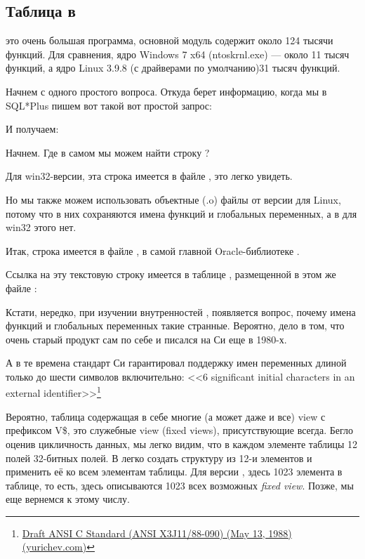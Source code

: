 \subsection{Таблица  в \oracle}

\myindex{\oracle}
 это очень большая программа, основной модуль  содержит около 124 тысячи функций. Для сравнения, ядро Windows 7 x64 (ntoskrnl.exe) --- около 11 тысяч функций, а ядро Linux 3.9.8 (с драйверами по умолчанию)\EMDASH{}31 тысяч функций.

Начнем с одного простого вопроса. Откуда \oracle берет информацию, когда мы в SQL*Plus пишем вот такой вот простой запрос:



И получаем:



Начнем. Где в самом \oracle мы можем найти строку ?

Для win32-версии, эта строка имеется в файле , это легко увидеть.

Но мы также можем использовать объектные (.o) файлы от версии \oracle для Linux, потому что в них сохраняются имена функций и глобальных переменных, а в  для win32 этого нет.

Итак, строка  имеется в файле , в самой главной Oracle-библиотеке .

Ссылка на эту текстовую строку имеется в таблице , размещенной в этом же файле :



Кстати, нередко, при изучении внутренностей \oracle, появляется вопрос, почему имена функций и глобальных переменных такие странные.
Вероятно, дело в том, что \oracle очень старый продукт сам по себе и писался на Си еще в 1980-х.

А в те времена стандарт Си гарантировал поддержку имен переменных длиной только до шести символов включительно:
<<6 significant initial characters in an external identifier>>\footnote{\href{http://go.yurichev.com/17142}{Draft ANSI C Standard (ANSI X3J11/88-090) (May 13, 1988) (yurichev.com)}}

Вероятно, таблица  содержащая в себе многие (а может даже и все) view с префиксом V\$, это служебные view (fixed views), присутствующие всегда.
Бегло оценив цикличность данных, мы легко видим, что в каждом элементе таблицы  12 полей 32-битных полей.
В \IDA легко создать структуру из 12-и элементов и применить её ко всем элементам таблицы.
Для версии , здесь 1023 элемента в таблице, то есть, здесь описываются 1023 всех возможных \emph{fixed view}.
Позже, мы еще вернемся к этому числу.

